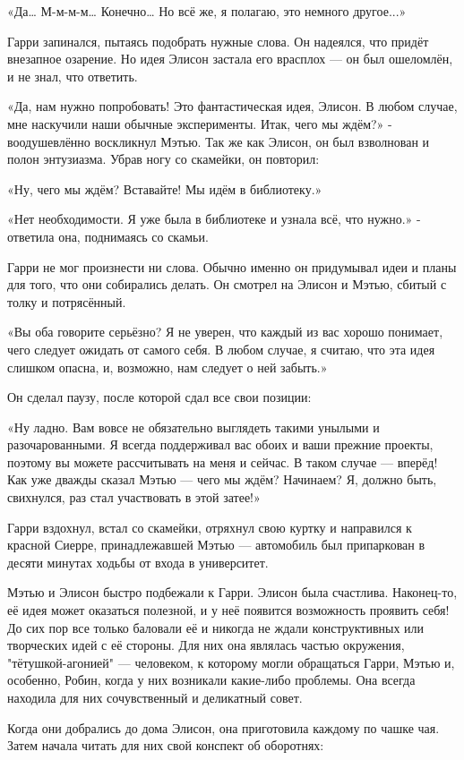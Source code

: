 \documentclass[a5paper, 9pt,
final, openany, twoside=true]{memoir}
\begin{document}
«Да… М-м-м-м… Конечно… Но всё же, я полагаю, это немного другое...»

Гарри запинался, пытаясь подобрать нужные слова. Он надеялся, что придёт внезапное озарение. Но идея Элисон застала его врасплох — он был ошеломлён, и не знал, что ответить.

«Да, нам нужно попробовать! Это фантастическая идея, Элисон. В любом случае, мне наскучили наши обычные эксперименты. Итак, чего мы ждём?» - воодушевлённо воскликнул Мэтью. Так же как Элисон, он был взволнован и полон энтузиазма. Убрав ногу со скамейки, он повторил:

«Ну, чего мы ждём? Вставайте! Мы идём в библиотеку.»

«Нет необходимости. Я уже была в библиотеке и узнала всё, что нужно.» - ответила она, поднимаясь со скамьи.

Гарри не мог произнести ни слова. Обычно именно он придумывал идеи и планы для того, что они собирались делать. Он смотрел на Элисон и Мэтью, сбитый с толку и потрясённый.

«Вы оба говорите серьёзно? Я не уверен, что каждый из вас хорошо понимает, чего следует ожидать от самого себя. В любом случае, я считаю, что эта идея слишком опасна, и, возможно, нам следует о ней забыть.»

Он сделал паузу, после которой сдал все свои позиции:

«Ну ладно. Вам вовсе не обязательно выглядеть такими унылыми и разочарованными. Я всегда поддерживал вас обоих и ваши прежние проекты, поэтому вы можете рассчитывать на меня и сейчас. В таком случае — вперёд! Как уже дважды сказал Мэтью — чего мы ждём? Начинаем? Я, должно быть, свихнулся, раз стал участвовать в этой затее!»

Гарри вздохнул, встал со скамейки, отряхнул свою куртку и направился к красной Сиерре, принадлежавшей Мэтью — автомобиль был припаркован в десяти минутах ходьбы от входа в университет.

Мэтью и Элисон быстро подбежали к Гарри. Элисон была счастлива. Наконец-то, её идея может оказаться полезной, и у неё появится возможность проявить себя! До сих пор все только баловали её и никогда не ждали конструктивных или творческих идей с её стороны. Для них она являлась частью окружения, "тётушкой-агонией" — человеком, к которому могли обращаться Гарри, Мэтью и, особенно, Робин, когда у них возникали какие-либо проблемы. Она всегда находила для них сочувственный и деликатный совет.

Когда они добрались до дома Элисон, она приготовила каждому по чашке чая. Затем начала читать для них свой конспект об оборотнях:
\end{document}

